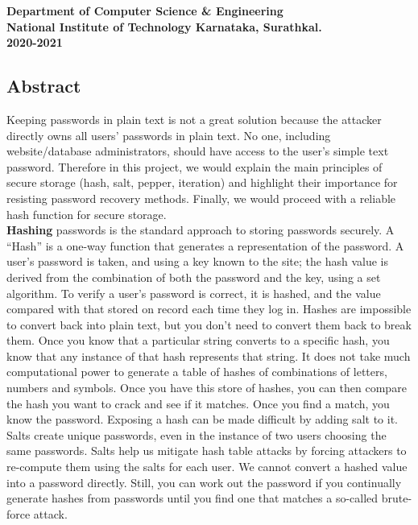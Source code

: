 \documentclass{article}[12pt,a4paper]
\begin{document}
\begin{titlepage}
\begin{figure}[!ht]
    \end{figure}
    {\Large \bfseries Department of Computer Science \& Engineering }\\
    \vspace{0.5em}
    {\Large \bfseries National Institute of Technology Karnataka, Surathkal.}\\
    \vspace{0.5em}
    {\Large \bfseries 2020-2021}
\end{titlepage}

\begin{center}
\section*{Abstract}
\end{center}

\vspace{2em}
Keeping passwords in plain text is not a great solution because the attacker directly
owns all users’ passwords in plain text. No one, including website/database administrators, should have access to the user’s simple text password. Therefore in this project,
we would explain the main principles of secure storage (hash, salt, pepper, iteration) and highlight their importance for resisting password recovery methods. Finally, we would
proceed with a reliable hash function for secure storage.\\
\textbf{Hashing} passwords is the standard approach to storing passwords securely. A “Hash” is a one-way function that generates a representation of the password. A user’s password is taken, and using a key known to the site; the hash value is derived from the combination of both the password and the key, using a set algorithm. To verify a user’s password is correct, it is hashed, and the value compared with that stored on record each time they log in. Hashes are impossible to convert back into plain text, but you don’t need to convert them back to break them. Once you know that a particular string converts
to a specific hash, you know that any instance of that hash represents that string. It does not take much computational power to generate a table of hashes of combinations of letters, numbers and symbols. Once you have this store of hashes, you can then compare the hash you want to crack and see if it matches. Once you find a match, you know the
password. Exposing a hash can be made difficult by adding salt to it. Salts create unique passwords, even in the instance of two users choosing the same passwords. Salts help us mitigate hash table attacks by forcing attackers to re-compute them using the salts for each user. We cannot convert a hashed value into a password directly. Still, you can work out the password if you continually generate hashes from passwords until you find one that matches a so-called brute-force attack.
\end{document}
